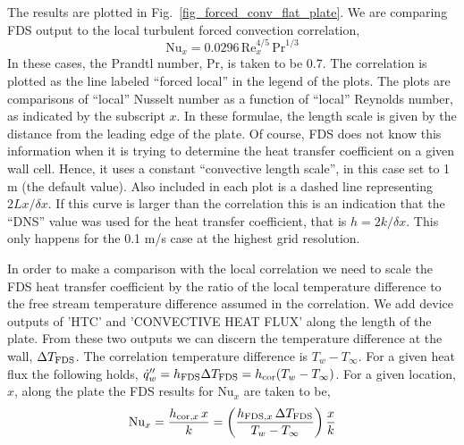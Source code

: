 \documentclass[11pt]{book}
\begin{document}
The results are plotted in Fig.~\ref{fig_forced_conv_flat_plate}.  We are comparing FDS output to the local turbulent forced convection correlation,
\begin{equation}
\label{eq:local_forced_flat_plate_cor}
\mbox{Nu}_x = 0.0296 \, \mbox{Re}_x^{4/5} \, \mbox{Pr}^{1/3}
\end{equation}
In these cases, the Prandtl number, Pr, is taken to be 0.7.  The correlation is plotted as the line labeled ``forced local'' in the legend of the plots.  The plots are comparisons of ``local'' Nusselt number as a function of ``local'' Reynolds number, as indicated by the subscript $x$.  In these formulae, the length scale is given by the distance from the leading edge of the plate.  Of course, FDS does not know this information when it is trying to determine the heat transfer coefficient on a given wall cell.  Hence, it uses a constant ``convective length scale'', in this case set to 1 m (the default value).  Also included in each plot is a dashed line representing $2Lx/\delta x$.  If this curve is larger than the correlation this is an indication that the ``DNS'' value was used for the heat transfer coefficient, that is $h = 2k/\delta x$.  This only happens for the 0.1 m/s case at the highest grid resolution.

In order to make a comparison with the local correlation we need to scale the FDS heat transfer coefficient by the ratio of the local temperature difference to the free stream temperature difference assumed in the correlation.  We add device outputs of {\ct 'HTC'} and {\ct 'CONVECTIVE HEAT FLUX'} along the length of the plate.  From these two outputs we can discern the temperature difference at the wall, $\Delta T_{\mbox{\scriptsize FDS}}$.  The correlation temperature difference is $T_w - T_\infty$.  For a given heat flux the following holds, $\dot{q}_w^{{\prime\prime}} = h_{\mbox{\scriptsize FDS}} \Delta T_{\mbox{\scriptsize FDS}} = h_{\mbox{\scriptsize cor}} (T_w - T_\infty)$.  For a given location, $x$, along the plate the FDS results for $\mbox{Nu}_x$ are taken to be,
\begin{equation}
\label{eq:Nu_scaling}
\mbox{Nu}_x = \frac{h_{\mbox{\scriptsize cor},x} \, x}{k} = \left( \frac{h_{\mbox{\scriptsize FDS},x} \, \Delta T_{\mbox{\scriptsize FDS}}}{T_w - T_\infty} \right) \frac{x}{k}
\end{equation}
\end{document}
